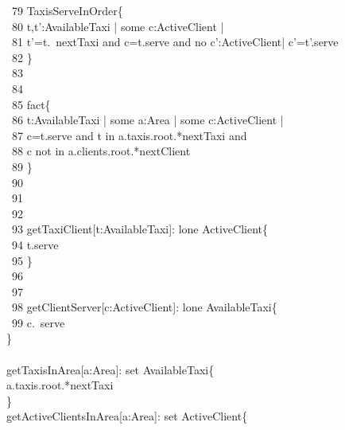 \-    \ 79	 TaxisServeInOrder\{\\
\-    \ 80	\qquad \- t,t':AvailableTaxi | {\color{blue}some} c:ActiveClient | \\
\-    \ 81	\qquad \-\qquad t'=t.~nextTaxi {\color{blue}and} c=t.serve {\color{blue}and} no c':ActiveClient| c'=t'.serve\\
\-    \ 82	\qquad \}\\
\-    \ 83	\qquad \\
\-    \ 84	\\
\-    \ 85	\qquad fact\{\\
\-    \ 86	\qquad \- t:AvailableTaxi | {\color{blue}some} a:Area | {\color{blue}some} c:ActiveClient | \\
\-    \ 87	\qquad \-\qquad c=t.serve {\color{blue}and} t {\color{blue}in} a.taxis.root.*nextTaxi {\color{blue}and} \\
\-    \ 88	\qquad \-\qquad c {\color{blue}not} in a.clients.root.*nextClient\\
\-    \ 89	\qquad \}\\
\-    \ 90	\qquad \\
\-    \ 91	\\
\-    \ 92	\\
\-    \ 93	 getTaxiClient[t:AvailableTaxi]: {\color{blue}lone} ActiveClient\{\\
\-    \ 94	\qquad \-\qquad t.serve\\
\-    \ 95	\qquad \}\\
\-    \ 96	\qquad \\
\-    \ 97	\\
\-    \ 98	 getClientServer[c:ActiveClient]: {\color{blue}lone} AvailableTaxi\{\\
\-    \ 99	\qquad \-\qquad c.~serve\\
	\qquad \}\\
	\\
	 getTaxisInArea[a:Area]: {\color{blue}set} AvailableTaxi\{\\
	\qquad \-\qquad a.taxis.root.*nextTaxi\\
	\qquad \}\\
	 getActiveClientsInArea[a:Area]: {\color{blue}set} ActiveClient\{\\
